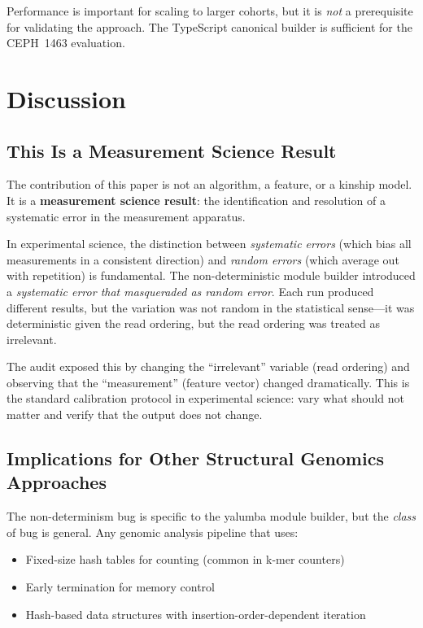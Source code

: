 \documentclass{../yalumba}
\begin{document}
Performance is important for scaling to larger cohorts, but it is \textit{not}
a prerequisite for validating the approach. The TypeScript canonical builder is
sufficient for the CEPH~1463 evaluation.


\section{Discussion}
\label{sec:discussion}

\subsection{This Is a Measurement Science Result}

The contribution of this paper is not an algorithm, a feature, or a kinship
model. It is a \textbf{measurement science result}: the identification and
resolution of a systematic error in the measurement apparatus.

In experimental science, the distinction between \textit{systematic errors}
(which bias all measurements in a consistent direction) and \textit{random
errors} (which average out with repetition) is fundamental. The non-deterministic
module builder introduced a \textit{systematic error that masqueraded as random
error}. Each run produced different results, but the variation was not random
in the statistical sense---it was deterministic given the read ordering, but
the read ordering was treated as irrelevant.

The audit exposed this by changing the ``irrelevant'' variable (read ordering)
and observing that the ``measurement'' (feature vector) changed dramatically.
This is the standard calibration protocol in experimental science: vary what
should not matter and verify that the output does not change.

\subsection{Implications for Other Structural Genomics Approaches}

The non-determinism bug is specific to the yalumba module builder, but the
\textit{class} of bug is general. Any genomic analysis pipeline that uses:

\begin{itemize}[leftmargin=2em]
  \item Fixed-size hash tables for counting (common in k-mer counters)
  \item Early termination for memory control
  \item Hash-based data structures with insertion-order-dependent iteration
\end{itemize}
\end{document}
